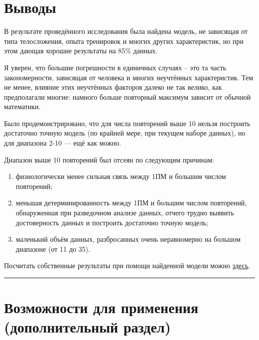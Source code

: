 \documentclass[
]{article}
\begin{document}
\hypertarget{ux432ux44bux432ux43eux434ux44b}{%
\section{Выводы}\label{ux432ux44bux432ux43eux434ux44b}}

В результате проведённого исследования была найдена модель, не зависящая
от типа телосложения, опыта тренировок и многих других характеристик, но
при этом дающая хорошие результаты на 85\% данных.

Я уверен, что большие погрешности в единичных случаях -- это та часть
закономерности, зависящая от человека и многих неучтённых характеристик.
Тем не менее, влияние этих неучтённых факторов далеко не так велико, как
предполагали многие: намного больше повторный максимум зависит от
обычной математики.

Было продемонстрировано, что для числа повторений выше 10 нельзя
построить достаточно точную модель (по крайней мере, при текущем наборе
данных), но для диапазона 2-10 --- ещё как можно.

Диапазон выше 10 повторений был отсеян по следующим причинам:

\begin{enumerate}
\def\labelenumi{\arabic{enumi}.}
\item
  физиологически менее сильная связь между 1ПМ и большим числом
  повторений;
\item
  меньшая детерминированность между 1ПМ и большим числом повторений,
  обнаруженная при разведочном анализе данных, отчего трудно выявить
  достоверность данных и построить достаточно точную модель;
\item
  маленький объём данных, разбросанных очень неравномерно на большом
  диапазоне (от 11 до 35).
\end{enumerate}

Посчитать собственные результаты при помощи найденной модели можно
\href{https://dmitrypasko.shinyapps.io/RMbyMRMestimating/}{здесь}.

\begin{center}\rule{0.5\linewidth}{0.5pt}\end{center}

\hypertarget{ux432ux43eux437ux43cux43eux436ux43dux43eux441ux442ux438-ux434ux43bux44f-ux43fux440ux438ux43cux435ux43dux435ux43dux438ux44f-ux434ux43eux43fux43eux43bux43dux438ux442ux435ux43bux44cux43dux44bux439-ux440ux430ux437ux434ux435ux43b}{%
\section{Возможности для применения (дополнительный
раздел)}\label{ux432ux43eux437ux43cux43eux436ux43dux43eux441ux442ux438-ux434ux43bux44f-ux43fux440ux438ux43cux435ux43dux435ux43dux438ux44f-ux434ux43eux43fux43eux43bux43dux438ux442ux435ux43bux44cux43dux44bux439-ux440ux430ux437ux434ux435ux43b}}
\end{document}
